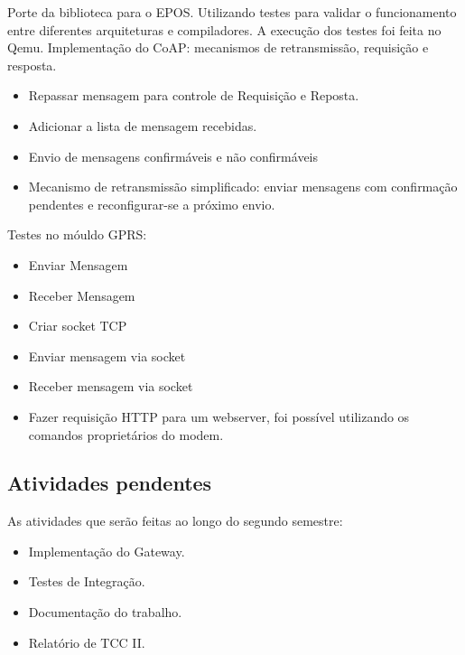 Porte da biblioteca para o EPOS. Utilizando testes para validar o funcionamento entre diferentes arquiteturas e compiladores. A execu\c{c}\~ao dos testes foi feita no Qemu. Implementa\c{c}\~ao do CoAP: mecanismos de retransmiss\~ao, requisi\c{c}\~ao e resposta.
\begin{itemize}[noitemsep,topsep=0pt,parsep=0pt,partopsep=0pt]
\item Repassar mensagem para controle de Requisi\c{c}\~ao e Reposta.
\item Adicionar a lista de mensagem recebidas.
\item Envio de mensagens confirm\'aveis e n\~ao confirm\'aveis
\item Mecanismo de retransmiss\~ao simplificado: enviar mensagens com confirma\c{c}\~ao pendentes e reconfigurar-se a pr\'oximo envio.
\end{itemize}

Testes no m\'ouldo GPRS:
\begin{itemize}[noitemsep,topsep=0pt,parsep=0pt,partopsep=0pt]
\item Enviar Mensagem
\item Receber Mensagem
\item Criar socket TCP
\item Enviar mensagem via socket
\item Receber mensagem via socket
\item Fazer requisi\c{c}\~ao HTTP para um webserver, foi poss\'ivel utilizando os comandos propriet\'arios do modem.
\end{itemize}

\subsection{Atividades pendentes}
As atividades que ser\~ao feitas ao longo do segundo semestre:
\begin{itemize}
    \item Implementa\c{c}\~ao do Gateway.
    \item Testes de Integra\c{c}\~ao.
    \item Documenta\c{c}\~ao do trabalho.
    \item Relat\'orio de TCC II.
\end{itemize}
